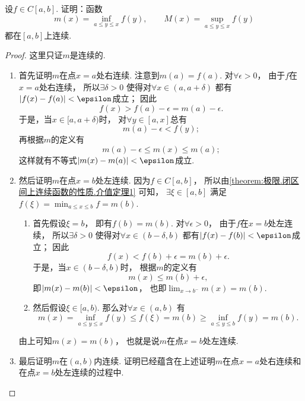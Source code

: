 \begin{example}
设\(f \in C[a,b]\).
证明：函数\[
	m(x) = \inf_{a \leq y \leq x} f(y), \qquad
	M(x) = \sup_{a \leq y \leq x} f(y)
\]都在\([a,b]\)上连续.
\begin{proof}
这里只证\(m\)是连续的.
\begin{enumerate}
	\item 首先证明\(m\)在点\(x=a\)处右连续.
	注意到\(m(a) = f(a)\).
	对\(\forall\epsilon>0\)，
	由于\(f\)在\(x=a\)处右连续，
	所以\(\exists\delta>0\)
	使得对\(\forall x\in(a,a+\delta)\)
	都有\(\abs{f(x)-f(a)}<\epsilon\)成立；
	因此\[
	f(x)
	> f(a) - \epsilon
	= m(a) - \epsilon.
	\]
	于是，当\(x\in[a,a+\delta)\)时，
	对\(\forall y\in[a,x]\)总有\[
		m(a) - \epsilon < f(y);
	\]
	再根据\(m\)的定义有\[
		m(a) - \epsilon \leq m(x) \leq m(a);
	\]
	这样就有不等式\(\abs{m(x)-m(a)}<\epsilon\)成立.

	\item 然后证明\(m\)在点\(x=b\)处左连续.
	因为\(f \in C[a,b]\)，
	所以由\cref{theorem:极限.闭区间上连续函数的性质.介值定理1} 可知，
	\(\exists\xi\in[a,b]\)
	满足\(f(\xi) = \min_{a \leq x \leq b} f = m(b)\).
		\begin{enumerate}
			\item 首先假设\(\xi=b\)，
			即有\(f(b)=m(b)\).
			对\(\forall\epsilon>0\)，
			由于\(f\)在\(x=b\)处左连续，
			所以\(\exists\delta>0\)
			使得对\(\forall x\in(b-\delta,b)\)
			都有\(\abs{f(x)-f(b)}<\epsilon\)成立；
			因此\[
				f(x)
				< f(b) + \epsilon
				= m(b) + \epsilon.
			\]
			于是，当\(x\in(b-\delta,b)\)时，
			根据\(m\)的定义有\[
				m(x) \leq m(b) + \epsilon,
			\]
			即\(\abs{m(x)-m(b)}<\epsilon\)，
			也即\(\lim_{x \to b^-} m(x) = m(b)\).

			\item 然后假设\(\xi\in[a,b)\).
			那么对\(\forall x\in(a,b)\)
			有\[
				m(x) = \inf_{a \leq y \leq x} f(y)
				\leq f(\xi)
				= m(b)
				\geq \inf_{a \leq y \leq b} f(y)
				= m(b).
			\]
		\end{enumerate}
		由上可知\(m(x) = m(b)\)，
		也就是说\(m\)在点\(x=b\)处左连续.

	\item 最后证明\(m\)在\((a,b)\)内连续.
	证明已经蕴含在上述证明\(m\)在点\(x=a\)处右连续和在点\(x=b\)处左连续的过程中.
	\qedhere
\end{enumerate}
\end{proof}
\end{example}
